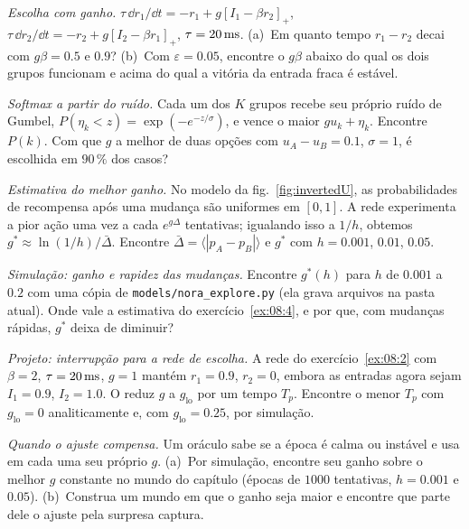 \begin{exercise}[\lvlB]
\label{ex:08:2}
\emph{Escolha com ganho.} $\tau\,\dd r_1/\dd t=-r_1+g[I_1-\beta r_2]_+$, $\tau\,\dd r_2/\dd t=-r_2+g[I_2-\beta r_1]_+$, $\tau=20\,\text{ms}$. (a)~Em quanto tempo $r_1-r_2$ decai com $g\beta=0.5$ e $0.9$? (b)~Com $\varepsilon=0.05$, encontre o $g\beta$ abaixo do qual os dois grupos funcionam e acima do qual a vitória da entrada fraca é estável.
\end{exercise}

\begin{exercise}[\lvlA]
\label{ex:08:3}
\emph{Softmax a partir do ruído.} Cada um dos $K$ grupos recebe seu próprio ruído de Gumbel, $P(\eta_k<z)=\exp(-e^{-z/\sigma})$, e vence o maior $gu_k+\eta_k$. Encontre $P(k)$. Com que $g$ a melhor de duas opções com $u_A-u_B=0.1$, $\sigma=1$, é escolhida em $90\,\%$ dos casos?
\end{exercise}

\begin{exercise}[\lvlB]
\label{ex:08:4}
\emph{Estimativa do melhor ganho.} No modelo da fig.~\ref{fig:invertedU}, as probabilidades de recompensa após uma mudança são uniformes em $[0,1]$. A rede experimenta a pior ação uma vez a cada $e^{g\Delta}$ tentativas; igualando isso a $1/h$, obtemos $g^*\approx\ln(1/h)/\bar\Delta$. Encontre $\bar\Delta=\langle|p_A-p_B|\rangle$ e $g^*$ com $h=0.001$, $0.01$, $0.05$.
\end{exercise}

\begin{exercise}[\lvlB]
\label{ex:08:5}
\emph{Simulação: ganho e rapidez das mudanças.} Encontre $g^*(h)$ para $h$ de $0.001$ a $0.2$ com uma cópia de \texttt{models/\allowbreak nora\_explore.py} (ela grava arquivos na pasta atual). Onde vale a estimativa do exercício~\ref{ex:08:4}, e por que, com mudanças rápidas, $g^*$ deixa de diminuir?
\end{exercise}

\begin{exercise}[\lvlB]
\label{ex:08:6}
\emph{Projeto: interrupção para a rede de escolha.} A rede do exercício~\ref{ex:08:2} com $\beta=2$, $\tau=20\,\text{ms}$, $g=1$ mantém $r_1=0.9$, $r_2=0$, embora as entradas agora sejam $I_1=0.9$, $I_2=1.0$. O  reduz $g$ a $g_{\text{lo}}$ por um tempo $T_p$. Encontre o menor $T_p$ com $g_{\text{lo}}=0$ analiticamente e, com $g_{\text{lo}}=0.25$, por simulação.
\end{exercise}

\begin{exercise}[\lvlC]
\label{ex:08:7}
\emph{Quando o ajuste compensa.} Um oráculo sabe se a época é calma ou instável e usa em cada uma seu próprio $g$. (a)~Por simulação, encontre seu ganho sobre o melhor $g$ constante no mundo do capítulo (épocas de $1000$ tentativas, $h=0.001$ e $0.05$). (b)~Construa um mundo em que o ganho seja maior e encontre que parte dele o ajuste pela surpresa captura.
\end{exercise}
